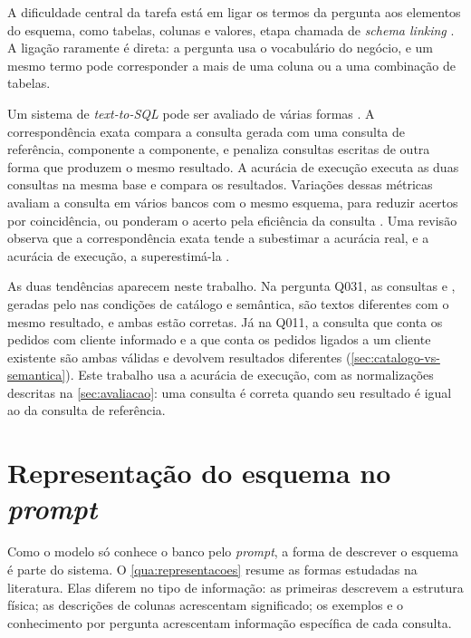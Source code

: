 A dificuldade central da tarefa está em ligar os termos da pergunta aos
elementos do esquema, como tabelas, colunas e valores, etapa chamada de
\textit{schema linking} \cite{hong2024survey}. A ligação raramente é
direta: a pergunta usa o vocabulário do negócio, e um mesmo termo pode
corresponder a mais de uma coluna ou a uma combinação de tabelas.

Um sistema de \textit{text-to-SQL} pode ser avaliado de várias formas
\cite{yu2018spider,li2023bird,shi2024survey}. A correspondência exata
compara a consulta gerada com uma consulta de referência, componente a
componente, e penaliza consultas escritas de outra forma que produzem o
mesmo resultado. A acurácia de execução executa as duas consultas na
mesma base e compara os resultados. Variações dessas métricas avaliam a
consulta em vários bancos com o mesmo esquema, para reduzir acertos por
coincidência, ou ponderam o acerto pela eficiência da consulta
\cite{li2023bird,shi2024survey}. Uma revisão observa que a
correspondência exata tende a subestimar a acurácia real, e a acurácia de
execução, a superestimá-la \cite{shi2024survey}.

As duas tendências aparecem neste trabalho. Na pergunta Q031, as
consultas  e
, geradas pelo
 nas condições de catálogo e semântica, são textos
diferentes com o mesmo resultado, e ambas estão corretas. Já na Q011, a
consulta que conta os pedidos com cliente informado e a que conta os
pedidos ligados a um cliente existente são ambas válidas e devolvem
resultados diferentes (\autoref{sec:catalogo-vs-semantica}). Este trabalho
usa a acurácia de execução, com as normalizações descritas na
\autoref{sec:avaliacao}: uma consulta é correta quando seu resultado é
igual ao da consulta de referência.

\section{Representação do esquema no \textit{prompt}}
\label{sec:representacao-esquema}

Como o modelo só conhece o banco pelo \textit{prompt}, a forma de
descrever o esquema é parte do sistema. O \autoref{qua:representacoes}
resume as formas estudadas na literatura. Elas diferem no tipo de
informação: as primeiras descrevem a estrutura física; as descrições de
colunas acrescentam significado; os exemplos e o conhecimento por
pergunta acrescentam informação específica de cada consulta.

